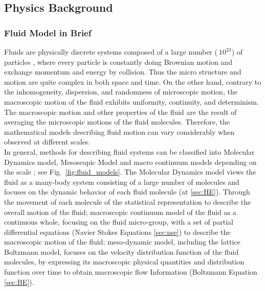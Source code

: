 \subsection{Physics Background} \label{sec:PB}

\subsubsection{Fluid Model in Brief}
Fluids are physically discrete systems composed of a large number ($~10^{23}$) of particles \cite{lbmmbook}, where every particle is constantly doing Brownian motion \cite{karatzas1998brownian} and exchange momentum and energy by collision. Thus the micro structure and motion are quite complex in both space and time. On the other hand, contrary to the inhomogeneity, dispersion, and randomness of microscopic motion, the macroscopic motion of the fluid exhibits uniformity, continuity, and determinism. The macroscopic motion and other properties of the fluid are the result of averaging the microscopic motions of the fluid molecules. Therefore, the mathematical models describing fluid motion can vary considerably when observed at different scales.\\

In general, methods for describing fluid systems can be classified into Molecular Dynamics model, Mesoscopic Model and macro continuum models depending on the scale \cite{karatzas1998brownian}; see Fig.~\ref{fig:fluid_models}. The Molecular Dynamics model views the fluid as a many-body system consisting of a large number of molecules and focuses on the dynamic behavior of each fluid molecule (at \ref{sec:HE}). Through the movement of each molecule of the statistical representation to describe the overall motion of the fluid; macroscopic continuum model of the fluid as a continuous whole, focusing on the fluid micro-group, with a set of partial differential equations (Navier Stokes Equations \ref{sec:nse}) to describe the macroscopic motion of the fluid; meso-dynamic model, including the lattice Boltzmann model, focuses on the velocity distribution function of the fluid molecules, by expressing its macroscopic physical quantities and distribution function over time to obtain macroscopic flow Information (Boltzmann Equation \ref{sec:BE}). \\

